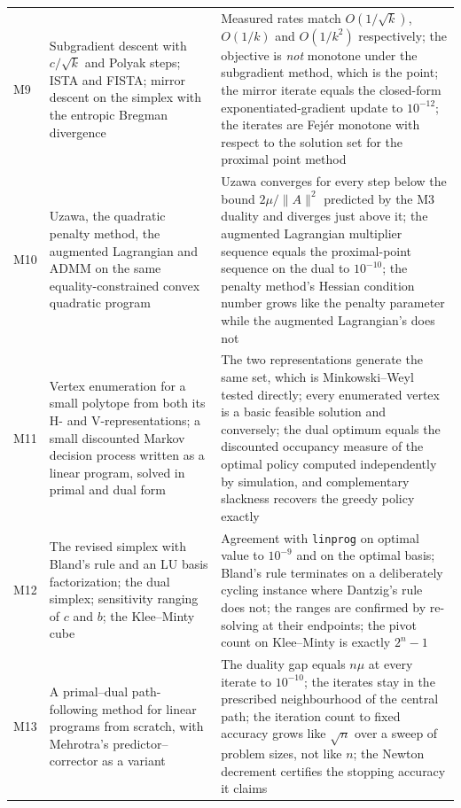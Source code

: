\documentclass[11pt,a4paper]{article}
\begin{document}
\begin{longtable}{@{}L{0.9cm} L{6.2cm} L{7.3cm}@{}}
M9 & Subgradient descent with $c/\sqrt{k}$ and Polyak steps; ISTA and FISTA; mirror descent
     on the simplex with the entropic Bregman divergence
   & Measured rates match $O(1/\sqrt k)$, $O(1/k)$ and $O(1/k^2)$ respectively; the objective
     is \emph{not} monotone under the subgradient method, which is the point; the mirror
     iterate equals the closed-form exponentiated-gradient update to $10^{-12}$; the iterates
     are Fej\'er monotone with respect to the solution set for the proximal point method \\

M10 & Uzawa, the quadratic penalty method, the augmented Lagrangian and ADMM on the same
      equality-constrained convex quadratic program
    & Uzawa converges for every step below the bound $2\mu/\|A\|^2$ predicted by the M3
      duality and diverges just above it; the augmented Lagrangian multiplier sequence equals
      the proximal-point sequence on the dual to $10^{-10}$; the penalty method's Hessian
      condition number grows like the penalty parameter while the augmented Lagrangian's does
      not \\

M11 & Vertex enumeration for a small polytope from both its H- and V-representations; a
      small discounted Markov decision process written as a linear program, solved in primal
      and dual form
    & The two representations generate the same set, which is Minkowski--Weyl tested
      directly; every enumerated vertex is a basic feasible solution and conversely; the dual
      optimum equals the discounted occupancy measure of the optimal policy computed
      independently by simulation, and complementary slackness recovers the greedy policy
      exactly \\

M12 & The revised simplex with Bland's rule and an LU basis factorization; the dual simplex;
      sensitivity ranging of $c$ and $b$; the Klee--Minty cube
    & Agreement with \texttt{linprog} on optimal value to $10^{-9}$ and on the optimal basis;
      Bland's rule terminates on a deliberately cycling instance where Dantzig's rule does
      not; the ranges are confirmed by re-solving at their endpoints; the pivot count on
      Klee--Minty is exactly $2^n-1$ \\

M13 & A primal--dual path-following method for linear programs from scratch, with Mehrotra's
      predictor--corrector as a variant
    & The duality gap equals $n\mu$ at every iterate to $10^{-10}$; the iterates stay in the
      prescribed neighbourhood of the central path; the iteration count to fixed accuracy
      grows like $\sqrt n$ over a sweep of problem sizes, not like $n$; the Newton decrement
      certifies the stopping accuracy it claims \\


\end{longtable}
\end{document}
